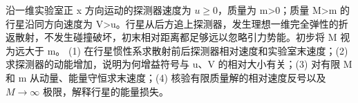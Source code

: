 沿一维实验室正 x 方向运动的探测器速度为 \(u\ge 0\)，质量为 m>0；质量 M>m 的行星沿同方向速度为 V>u。行星从后方追上探测器，发生理想一维完全弹性的折返散射，不发生碰撞破坏，初末相对距离都足够远以忽略引力势能。初步将 M 视为远大于 m。
(1) 在行星惯性系求散射前后探测器相对速度和实验室末速度；(2) 求探测器的动能增加，说明为何增益符号与 u、V 的相对大小有关；(3) 对有限 M 和 m 从动量、能量守恒求末速度；(4) 核验有限质量解的相对速度反号以及 \(M\to \infty \) 极限，解释行星的能量损失。
